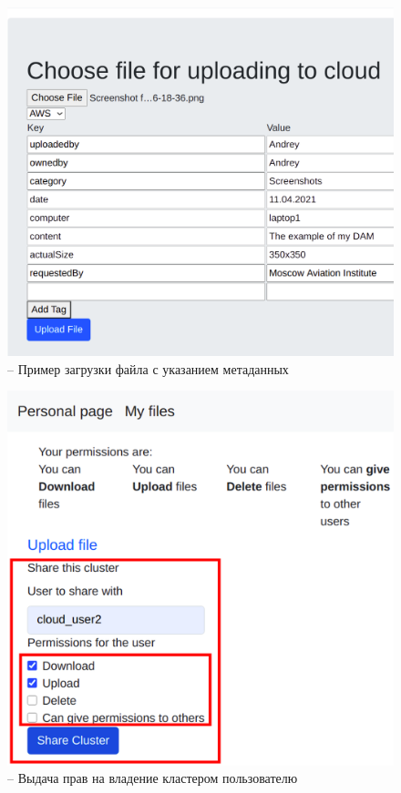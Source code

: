 \begin{figure}[H]
    \centering
    \includegraphics[scale=0.4]{images/mvp/2_ExampleFileUpload.png}
    \caption{-- Пример загрузки файла с указанием метаданных}
    \label{fileUpload}
\end{figure}

\begin{figure}[H]
    \centering
    \includegraphics[scale=0.35]{images/mvp/3_GivePermissions.png}
    \caption{-- Выдача прав на владение кластером пользователю}
    \label{addPermissions}
\end{figure}


